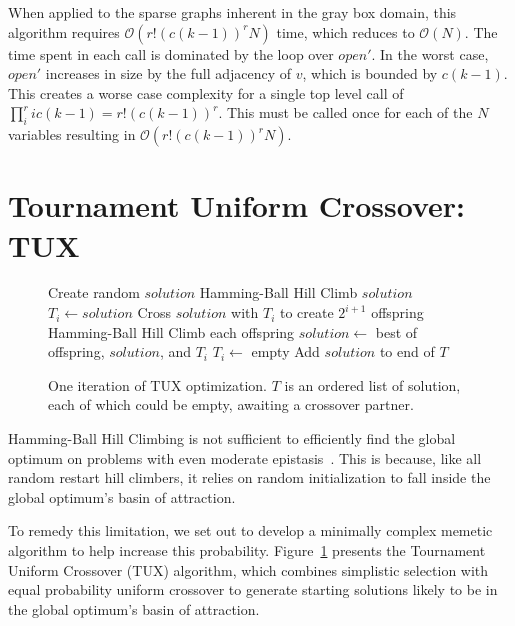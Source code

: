 \documentclass{sig-alternate}
\newcommand{\BigO}[1]{$\mathcal{O}{(#1)}$}
\begin{document}
When applied to the sparse graphs inherent in the gray box domain, this algorithm
requires \BigO{r!(c(k-1))^rN} time, which reduces to \BigO{N}. The time spent
in each call is dominated by the loop over $open'$. In the worst case, $open'$
increases in size by the full adjacency of $v$, which is bounded by $c(k-1)$.
This creates a worse case complexity for a single top level call of
$\prod_{i}^{r} ic(k-1) = r!(c(k-1))^r$. This must be called once for each
of the $N$ variables resulting in \BigO{r!(c(k-1))^rN}.

\section{Tournament Uniform Crossover: TUX}
\label{sec-tux}
\begin{figure}
  \begin{algorithmic}[1]
    \State Create random $solution$
    \State Hamming-Ball Hill Climb $solution$
        \State $T_i \leftarrow solution$
        \State \Return
      \EndIf
      \State Cross $solution$ with $T_i$ to create $2^{i+1}$ offspring
      \State Hamming-Ball Hill Climb each offspring
      \State $solution \leftarrow$ best of offspring, $solution$, and $T_i$
      \State $T_i \leftarrow$ empty
    \EndFor
    \State Add $solution$ to end of $T$
  \EndProcedure
\end{algorithmic}
  \caption{One iteration of TUX optimization. $T$ is an
           ordered list of solution, each of which could be empty,
           awaiting a crossover partner.}
  \label{fig-TUX}
\end{figure}

Hamming-Ball Hill Climbing is not sufficient to efficiently find the global optimum
on problems with even moderate epistasis~\cite{chicano:2014:ball}. This is because,
like all random restart hill climbers, it relies on random initialization to fall
inside the global optimum's basin of attraction.

To remedy this limitation, we set out to develop a minimally complex memetic
algorithm to help increase this probability. Figure~\ref{fig-TUX} presents
the Tournament Uniform Crossover (TUX) algorithm, which combines simplistic
selection with equal probability uniform crossover to generate starting
solutions likely to be in the global optimum's basin of attraction.
\end{document}
